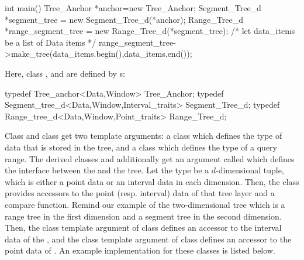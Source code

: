 {\small
\begin{cprog}
int main(){
  Tree_Anchor *anchor=new Tree_Anchor;
  Segment_Tree_d *segment_tree = new Segment_Tree_d(*anchor);
  Range_Tree_d *range_segment_tree = new Range_Tree_d(*segment_tree);
  /* let data_items be a list of Data items */
  range_segment_tree->make_tree(data_items.begin(),data_items.end());
}
\end{cprog}
}

Here, class , and
 are defined by s:

{\small
\begin{cprog}
typedef Tree_anchor<Data,Window> Tree_Anchor;
typedef Segment_tree_d<Data,Window,Interval_traits> Segment_Tree_d;
typedef Range_tree_d<Data,Window,Point_traits> Range_Tree_d;
\end{cprog}
}







Class  and class
 get  two template arguments: a class
 which defines the type of data that is stored in
the tree, and a class  which defines the type of a query
range.
The derived classes  and 
additionally get an argument called
 which defines the interface between the
 and the tree. Let the  type be a $d$-dimensional
tuple, which is either a point data or an interval data in each
dimension. Then, the class  provides accessors to
the point (resp. interval) data of that tree layer and a compare
function. Remind our example of the two-dimensional tree which
is a range tree in  the first dimension and
a segment tree  in the second dimension. Then, the
 class template argument of class
 defines an accessor to the interval data of
the , and the
 class template argument of class
 defines an accessor to the point data of
.
An example implementation for these classes is listed below.

